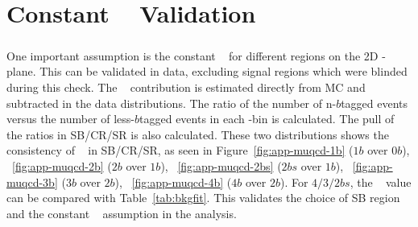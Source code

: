 \chapter{Constant \muqcd~ Validation}
\label{AppendixMuqcd}

\paragraph{}
One important assumption is the constant \muqcd~ for different regions on the 2D \mleadJ-\msublJ plane. 
This can be validated in data, excluding signal regions which were blinded during this check. 
The \ttbar~ contribution is estimated directly from MC and subtracted in the data distributions. 
The ratio of the number of n-$b$tagged events versus the number of less-$b$tagged events in each \mleadJ-\msublJ bin is calculated.
The pull of the ratios in SB/CR/SR is also calculated.
These two distributions shows the consistency of \muqcd~ in SB/CR/SR, as seen in Figure~\ref{fig:app-muqcd-1b} ($1b$ over $0b$), ~\ref{fig:app-muqcd-2b} ($2b$ over $1b$), ~\ref{fig:app-muqcd-2bs} ($2bs$ over $1b$), ~\ref{fig:app-muqcd-3b} ($3b$ over $2b$), ~\ref{fig:app-muqcd-4b} ($4b$ over $2b$). For $4/3/2bs$, the \muqcd~ value can be compared with Table~\ref{tab:bkgfit}.
This validates the choice of SB region and the constant \muqcd~ assumption in the analysis.


